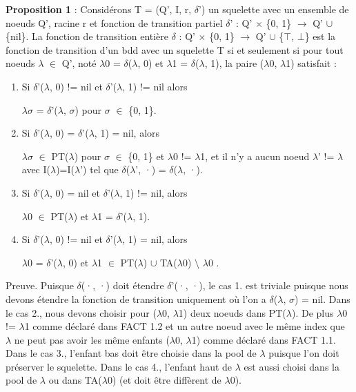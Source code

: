 \documentclass[french]{article}
\begin{document}
\textbf{Proposition 1} :  Considérons T = (Q’, I, r, \(\delta\)’) un squelette avec un ensemble de noeuds Q’, racine r et fonction de transition partiel \(\delta\)’ : Q’ \(\times\) \{0, 1\} \(\rightarrow\) Q’ \(\cup\) \{nil\}. La fonction de transition entière \(\delta\) : Q’ \(\times\) \{0, 1\} \(\rightarrow\) Q’ \(\cup\) \{\(\top\), \(\bot\)\} est la fonction de transition d'un bdd avec un squelette T si et seulement si pour tout noeuds \(\lambda\) \(\in\) Q’, noté \(\lambda\)0 = \(\delta\)(\(\lambda\), 0) et \(\lambda\)1 = \(\delta\)(\(\lambda\), 1), la paire (\(\lambda\)0, \(\lambda\)1) satisfait : 
\begin{enumerate}
    \item 
	Si \(\delta\)’(\(\lambda\), 0) != nil et \(\delta\)’(\(\lambda\), 1) != nil alors 
	\begin{center}
	\(\lambda\)\(\sigma\) = \(\delta\)’(\(\lambda\), \(\sigma\)) pour \(\sigma\) \(\in\) \{0, 1\}.
    \end{center}
    \item
	Si \(\delta\)’(\(\lambda\), 0) = \(\delta\)’(\(\lambda\), 1) = nil, alors 
	\begin{center}
	\(\lambda\)\(\sigma\) \(\in\) PT(\(\lambda\))  pour \(\sigma\) \(\in\) \{0, 1\} et \(\lambda\)0 != \(\lambda\)1, et il n'y a aucun noeud \(\lambda\)’ != \(\lambda\) avec I(\(\lambda\))=I(\(\lambda\)’) tel que \(\delta\)(\(\lambda\)’, ·) = \(\delta\)(\(\lambda\), ·).
    \end{center}
    \item
	Si \(\delta\)’(\(\lambda\), 0) = nil et \(\delta\)’(\(\lambda\), 1) != nil, alors
	\begin{center}
	\(\lambda\)0 \(\in\) PT(\(\lambda\)) et \(\lambda\)1 = \(\delta\)’(\(\lambda\), 1).
	\end{center}
    \item
	Si \(\delta\)’(\(\lambda\), 0) != nil et \(\delta\)’(\(\lambda\), 1) = nil, alors 
	\begin{center}
	\(\lambda\)0 = \(\delta\)’(\(\lambda\), 0) et \(\lambda\)1 \(\in\) PT(\(\lambda\)) \(\cup\) TA(\(\lambda\)0) \(\setminus\) \(\lambda\)0 .
    \end{center}
\end{enumerate}
\newpage
Preuve. Puisque \(\delta\)(·, ·) doit étendre \(\delta\)’(·, ·), le cas 1. est triviale puisque nous devons étendre la fonction de transition uniquement où l'on a \(\delta\)(\(\lambda\), \(\sigma\)) = nil. Dans le cas 2., nous devons choisir pour (\(\lambda\)0, \(\lambda\)1) deux noeuds dans PT(\(\lambda\)). De plus \(\lambda\)0 != \(\lambda\)1 comme déclaré dans FACT 1.2 et un autre noeud avec le même index que \(\lambda\) ne peut pas avoir les même enfants (\(\lambda\)0, \(\lambda\)1) comme déclaré dans FACT 1.1. Dans le cas 3., l'enfant bas doit être choisie dans la pool de \(\lambda\) puisque l'on doit préserver le squelette. Dans le cas 4., l'enfant haut de \(\lambda\) est aussi choisi dans la pool de  \(\lambda\) ou dans TA(\(\lambda\)0) (et doit être diffèrent de \(\lambda\)0).
\vspace{5mm} 
\end{document}
